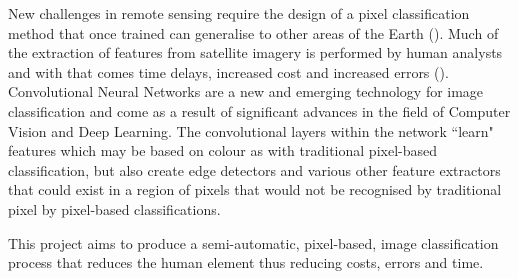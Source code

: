 New challenges in remote sensing require the design of a pixel classification method that once trained can generalise to other areas of the Earth (\cite{maggiori17a}). Much of the extraction of features from satellite imagery is performed by human analysts and with that comes time delays, increased cost and increased errors (\cite{mnih13}).
Convolutional Neural Networks are a new and emerging technology for image classification and come as a result of significant advances in the field of Computer Vision and Deep Learning. The convolutional layers within the network ``learn" features which may be based on colour as with traditional pixel-based classification, but also create edge detectors and various other feature extractors that could exist in a region of pixels that would not be recognised by traditional pixel by pixel-based classifications.
\par
This project aims to produce a semi-automatic, pixel-based, image classification process that reduces the human element thus reducing costs, errors and time.

